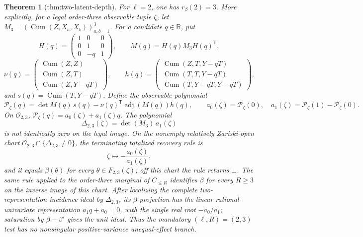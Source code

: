 \documentclass{article}
\newtheorem{theorem}{Theorem}
\begin{document}
\begin{theorem}[thm:two-latent-depth]\label{thm:two-latent-depth}
For \(\ell=2\), one has \(r_\beta(2)=3\).  More explicitly, for a legal order-three observable tuple \(\zeta\), let \(M_3=(\operatorname{Cum}(Z,X_a,X_b))_{a,b=1}^3\).  For a candidate \(q\in\mathbb R\), put
\[
 H(q)=\begin{pmatrix}1&0&0\\0&1&0\\0&-q&1\end{pmatrix},
 \qquad M(q)=H(q)M_3H(q)^{\mathsf T},
\]
\[
 \nu(q)=\begin{pmatrix}
 \operatorname{Cum}(Z,Z)\\
 \operatorname{Cum}(Z,T)\\
 \operatorname{Cum}(Z,Y-qT)
 \end{pmatrix},\qquad
 h(q)=\begin{pmatrix}
 \operatorname{Cum}(Z,T,Y-qT)\\
 \operatorname{Cum}(T,T,Y-qT)\\
 \operatorname{Cum}(T,Y-qT,Y-qT)
 \end{pmatrix},
\]
and \(s(q)=\operatorname{Cum}(T,Y-qT)\).  Define the observable polynomial
\[
 \mathcal P_\zeta(q)=\det M(q)\,s(q)-\nu(q)^{\mathsf T}\operatorname{adj}(M(q))h(q),
 \qquad a_0(\zeta)=\mathcal P_\zeta(0),\quad
 a_1(\zeta)=\mathcal P_\zeta(1)-\mathcal P_\zeta(0).
\]
On \(\mathcal O_{2,3}\), \(\mathcal P_\zeta(q)=a_0(\zeta)+a_1(\zeta)q\).  The polynomial
\[
 \Delta_{2,3}(\zeta)=\det(M_3)\,a_1(\zeta)
\]
is not identically zero on the legal image.  On the nonempty relatively Zariski-open chart \(\mathcal O_{2,3}\cap\{\Delta_{2,3}\ne0\}\), the terminating totalized recovery rule is
\[
 \zeta\longmapsto -\frac{a_0(\zeta)}{a_1(\zeta)},
\]
and it equals \(\beta(\theta)\) for every \(\theta\in F_{2,3}(\zeta)\); off this chart the rule returns \(\bot\).  The same rule applied to the order-three marginal of \(C_{\le R}\) identifies \(\beta\) for every \(R\ge3\) on the inverse image of this chart.  After localizing the complete two-representation incidence ideal by \(\Delta_{2,3}\), its \(\beta\)-projection has the linear rational-univariate representation \(a_1q+a_0=0\), with the single real root \(-a_0/a_1\); saturation by \(\beta-\beta'\) gives the unit ideal.  Thus the mandatory \((\ell,R)=(2,3)\) test has no nonsingular positive-variance unequal-effect branch.
\end{theorem}
\end{document}
